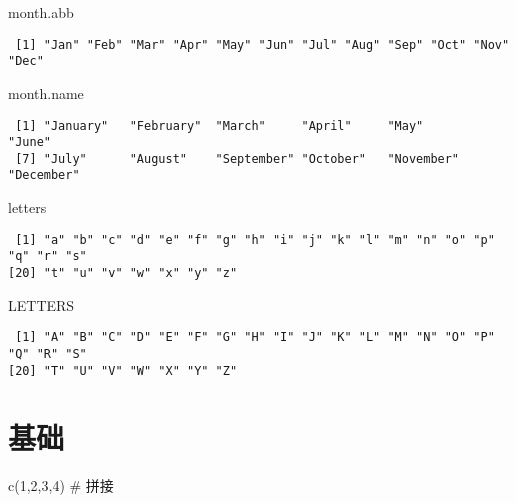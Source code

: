 \documentclass[
  letterpaper,
  DIV=11,
  numbers=noendperiod]{scrreprt}
\newenvironment{Shaded}{\begin{snugshade}}{\end{snugshade}}
\newcommand{\CommentTok}[1]{\textcolor[rgb]{0.37,0.37,0.37}{#1}}
\newcommand{\DecValTok}[1]{\textcolor[rgb]{0.68,0.00,0.00}{#1}}
\newcommand{\FunctionTok}[1]{\textcolor[rgb]{0.28,0.35,0.67}{#1}}
\newcommand{\NormalTok}[1]{\textcolor[rgb]{0.00,0.23,0.31}{#1}}
\begin{document}
\begin{Shaded}
\begin{Highlighting}[]
\NormalTok{month.abb}
\end{Highlighting}
\end{Shaded}

\begin{verbatim}
 [1] "Jan" "Feb" "Mar" "Apr" "May" "Jun" "Jul" "Aug" "Sep" "Oct" "Nov" "Dec"
\end{verbatim}

\begin{Shaded}
\begin{Highlighting}[]
\NormalTok{month.name}
\end{Highlighting}
\end{Shaded}

\begin{verbatim}
 [1] "January"   "February"  "March"     "April"     "May"       "June"     
 [7] "July"      "August"    "September" "October"   "November"  "December" 
\end{verbatim}

\begin{Shaded}
\begin{Highlighting}[]
\NormalTok{letters}
\end{Highlighting}
\end{Shaded}

\begin{verbatim}
 [1] "a" "b" "c" "d" "e" "f" "g" "h" "i" "j" "k" "l" "m" "n" "o" "p" "q" "r" "s"
[20] "t" "u" "v" "w" "x" "y" "z"
\end{verbatim}

\begin{Shaded}
\begin{Highlighting}[]
\NormalTok{LETTERS}
\end{Highlighting}
\end{Shaded}

\begin{verbatim}
 [1] "A" "B" "C" "D" "E" "F" "G" "H" "I" "J" "K" "L" "M" "N" "O" "P" "Q" "R" "S"
[20] "T" "U" "V" "W" "X" "Y" "Z"
\end{verbatim}

\section{基础}\label{ux57faux7840}

\begin{Shaded}
\begin{Highlighting}[]
\FunctionTok{c}\NormalTok{(}\DecValTok{1}\NormalTok{,}\DecValTok{2}\NormalTok{,}\DecValTok{3}\NormalTok{,}\DecValTok{4}\NormalTok{) }\CommentTok{\# 拼接}
\end{Highlighting}
\end{Shaded}
\end{document}
